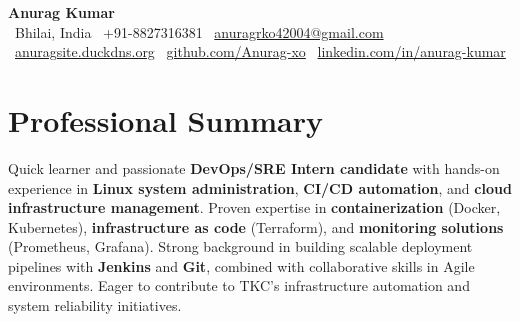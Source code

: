 \documentclass[letterpaper,10pt]{article}
\begin{document}
\begin{center}
    {\Huge\textbf{\color{accentcolor}Anurag Kumar}} \\ \vspace{8pt}
    \small
    \faMapMarker* \ Bhilai, India \quad
    \faPhone \ +91-8827316381 \quad
    \faEnvelope \ \href{mailto:anuragrko42004@gmail.com}{anuragrko42004@gmail.com}
    \\ \vspace{4pt}
    \faGlobe \ \href{http://anuragsite.duckdns.org}{anuragsite.duckdns.org} \quad
    \faGithub \ \href{https://github.com/Anurag-xo}{github.com/Anurag-xo} \quad
    \faLinkedin \ \href{https://www.linkedin.com/in/anurag-kumar-b1a790249}{linkedin.com/in/anurag-kumar}
\end{center}
\vspace{-15pt}

\section{Professional Summary}
\vspace{2pt}
Quick learner and passionate \textbf{DevOps/SRE Intern candidate} with hands-on experience in \textbf{Linux system administration}, \textbf{CI/CD automation}, and \textbf{cloud infrastructure management}. Proven expertise in \textbf{containerization} (Docker, Kubernetes), \textbf{infrastructure as code} (Terraform), and \textbf{monitoring solutions} (Prometheus, Grafana). Strong background in building scalable deployment pipelines with \textbf{Jenkins} and \textbf{Git}, combined with collaborative skills in Agile environments. Eager to contribute to TKC's infrastructure automation and system reliability initiatives.

\end{document}

